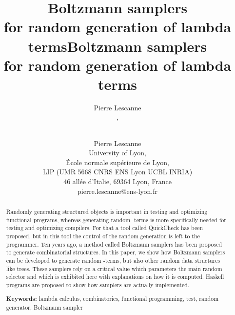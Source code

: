 \documentclass{sig-alternate}
\begin{document}
\ifICFP {}


\title{Boltzmann samplers \\for random generation of lambda terms} 


 \author{ \alignauthor
  Pierre Lescanne\\
  , \\
   \\
  }
\else
\author{Pierre Lescanne\\
   University of Lyon, \\
  {\'Ecole normale sup\'erieure de Lyon,} \\
  {LIP (UMR 5668 CNRS ENS Lyon UCBL INRIA)}\\
    {46 all\'ee d'Italie, 69364 Lyon, France}\\
    \textsf{pierre.lescanne@ens-lyon.fr} }
\title{Boltzmann samplers \\for random generation of lambda terms} 
\fi
\maketitle
\begin{abstract}
  \begin{sloppypar}
    Randomly generating structured objects is important in testing and optimizing
    functional programs, whereas generating random -terms is more specifically
    needed for testing and optimizing compilers.  For that a tool called
    \textsf{QuickCheck} has been proposed, but in this tool the
    control of the random generation is left to the programmer.  Ten years ago, a
    method called Boltzmann samplers has been proposed to generate combinatorial
    structures.  In this paper, we show how Boltzmann samplers can be developed to
    generate random \mbox{-terms}, but also other random data structures like trees.  These
    samplers rely on a critical value which parameters the main random selector and
    which is exhibited here with explanations on how it is computed.
    \textsf{Haskell} programs are proposed to show how samplers are actually
    implemented.
  \end{sloppypar}

\ifICFP\else 
\noindent\textbf{Keywords: } lambda calculus, combinatorics, functional programming,
  test, random generator, Boltzmann sampler \fi
\end{abstract}
\end{document}
